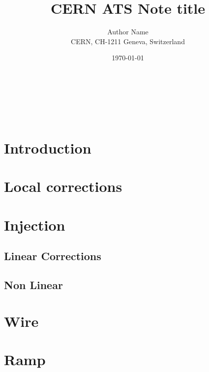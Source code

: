 \documentclass{cernatsnote}
\title{CERN ATS Note title}
\author{
	Author Name \; \\		
	CERN, CH-1211 Geneva, Switzerland
}
\date{\today}
\begin{document}
\maketitle

\begin{abstract}

\end{abstract}
\\ \\ \\ 

\begingroup
\color{black}
\tableofcontents
\endgroup

\pagebreak

\section{Introduction}
\section{Local corrections}
\section{Injection}
\subsection{Linear Corrections}
\subsection{Non Linear}
\section{Wire}
\section{Ramp}




\end{document}
